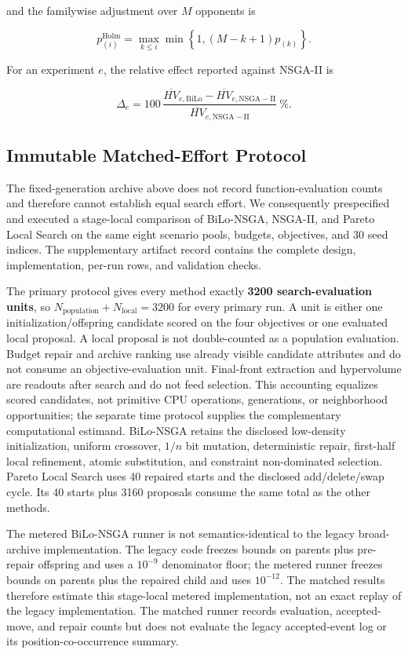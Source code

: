 \documentclass[applsci,article,submit,moreauthors]{Definitions/mdpi}
\begin{document}
and the familywise adjustment over \(M\) opponents is

\[
p^{\mathrm{Holm}}_{(i)}=\max_{k\leq i}\min\!\left\{1,(M-k+1)p_{(k)}\right\}.
\]

For an experiment \(e\), the relative effect reported against NSGA-II is

\[
\Delta_e=100\,\frac{\overline{HV}_{e,\mathrm{BiLo}}-\overline{HV}_{e,\mathrm{NSGA-II}}}{\overline{HV}_{e,\mathrm{NSGA-II}}}\ \%.
\]

\subsection{Immutable Matched-Effort Protocol}\label{immutable-matched-effort-protocol}

The fixed-generation archive above does not record function-evaluation counts and therefore cannot establish equal search effort. We consequently prespecified and executed a stage-local comparison of BiLo-NSGA, NSGA-II, and Pareto Local Search on the same eight scenario pools, budgets, objectives, and 30 seed indices. The supplementary artifact record contains the complete design, implementation, per-run rows, and validation checks.

The primary protocol gives every method exactly \textbf{3200 search-evaluation units}, so \(N_{\mathrm{population}}+N_{\mathrm{local}}=3200\) for every primary run. A unit is either one initialization/offspring candidate scored on the four objectives or one evaluated local proposal. A local proposal is not double-counted as a population evaluation. Budget repair and archive ranking use already visible candidate attributes and do not consume an objective-evaluation unit. Final-front extraction and hypervolume are readouts after search and do not feed selection. This accounting equalizes scored candidates, not primitive CPU operations, generations, or neighborhood opportunities; the separate time protocol supplies the complementary computational estimand. BiLo-NSGA retains the disclosed low-density initialization, uniform crossover, \(1/n\) bit mutation, deterministic repair, first-half local refinement, atomic substitution, and constraint non-dominated selection. Pareto Local Search uses 40 repaired starts and the disclosed add/delete/swap cycle. Its 40 starts plus 3160 proposals consume the same total as the other methods.

The metered BiLo-NSGA runner is not semantics-identical to the legacy broad-archive implementation. The legacy code freezes bounds on parents plus pre-repair offspring and uses a \(10^{-9}\) denominator floor; the metered runner freezes bounds on parents plus the repaired child and uses \(10^{-12}\). The matched results therefore estimate this stage-local metered implementation, not an exact replay of the legacy implementation. The matched runner records evaluation, accepted-move, and repair counts but does not evaluate the legacy accepted-event log or its position-co-occurrence summary.
\end{document}
